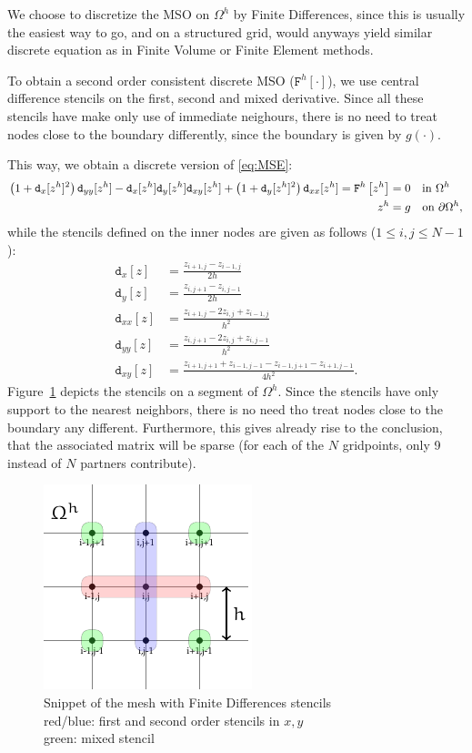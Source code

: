 \documentclass[11pt]{scrartcl}
\newcommand{\mSurfDisc}[1]{\ensuremath{\mathtt{F}^h\left[#1\right]}}
\newcommand{\Dx}[1]{\ensuremath{\mathtt{d}_x[#1]}}
\newcommand{\Dy}[1]{\ensuremath{\mathtt{d}_y[#1]}}
\newcommand{\Dxx}[1]{\ensuremath{\mathtt{d}_{xx}[#1]}}
\newcommand{\Dyy}[1]{\ensuremath{\mathtt{d}_{yy}[#1]}}
\newcommand{\Dxy}[1]{\ensuremath{\mathtt{d}_{xy}[#1]}}
\begin{document}
We choose to discretize the MSO on $\Omega^h$ by Finite Differences, since this is usually the easiest way to go, and on a structured grid, would anyways yield similar discrete equation as in Finite Volume or Finite Element methods.

To obtain a second order consistent discrete MSO (\mSurfDisc{\cdot}), we use central difference stencils on the first, second and mixed derivative. Since all these stencils have make only use of immediate neighours, there is no need to treat nodes close to the boundary differently, since the boundary is given by $g(\cdot)$.

This way, we obtain a discrete version of \eqref{eq:MSE}:
\begin{align}
	\left(1+\Dx{z^h}^2\right)\Dyy{z^h}-\Dx{z^h} \Dy{z^h}\Dxy{z^h} + \left(1+\Dy{z^h}^2\right)\Dxx{z^h} = \mSurfDisc{z^h} &= 0  \quad \text{in } \Omega^h \notag \\
	z^h &= g \quad \text{on } \partial\Omega^h \label{eq:dMSE},
\end{align}
while the stencils defined on the inner nodes are given as follows ($1 \le i,j \le N-1$):
\begin{align}
	\Dx{z} &= \frac{z_{i+1,j}-z_{i-1,j}}{2h} \\
	\Dy{z} &= \frac{z_{i,j+1}-z_{i,j-1}}{2h} \\
	\Dxx{z} &= \frac{z_{i+1,j} - 2z_{i,j} + z_{i-1,j}}{h^2}\\
	\Dyy{z} &= \frac{z_{i,j+1} - 2z_{i,j} + z_{i,j-1}}{h^2}\\
	\Dxy{z} &= \frac{z_{i+1,j+1} + z_{i-1,j-1} - z_{i-1,j+1}-z_{i+1,j-1}}{4h^2}. 
\end{align}
Figure~\ref{fig:fdmmesh} depicts the stencils on a segment of $\Omega^h$.
Since the stencils have only support to the nearest neighbors, there is no need tho treat nodes close to the boundary any different. Furthermore, this gives already rise to the conclusion, that the associated matrix will be sparse (for each of the $N$ gridpoints, only 9 instead of $N$ partners contribute).

\begin{figure}
	\centering
	\includegraphics[width=.4\linewidth]{figs/FDMMesh}
	\caption{Snippet of the mesh with Finite Differences stencils\\red/blue: first and second order stencils in $x,y$\\
	green: mixed stencil}\label{fig:fdmmesh}
\end{figure}
\newpage
\end{document}
